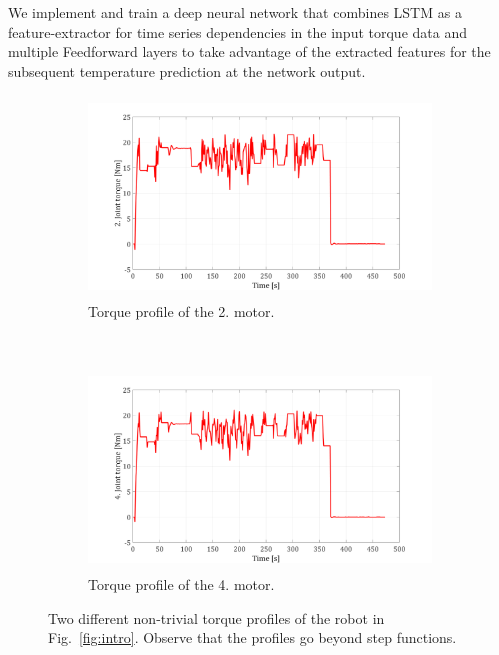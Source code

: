 \documentclass{ifacconf}
\begin{document}
We implement and train a deep neural network that combines LSTM as a feature-extractor for time series dependencies in the input torque data and multiple Feedforward layers to take advantage of the extracted features for the subsequent temperature prediction at the network output.

\begin{figure}[t!]
	\centering
	\begin{subfigure}[b]{1.\columnwidth}
		\centering
		\includegraphics[height=2.1in]{./pictures/applications/T2.png}
		\caption{Torque profile of the 2. motor.}
	\end{subfigure}%
	~ 
	\begin{subfigure}[b]{1.\columnwidth}
		\centering
		\includegraphics[height=2.1in]{./pictures/applications/T4.png}
		\caption{Torque profile of the 4. motor.}
	\end{subfigure}
	\caption{Two different non-trivial  torque profiles of the robot in Fig.~\ref{fig:intro}. Observe that the profiles go beyond step functions. }
	\label{jointtorque}
\end{figure}
\end{document}

